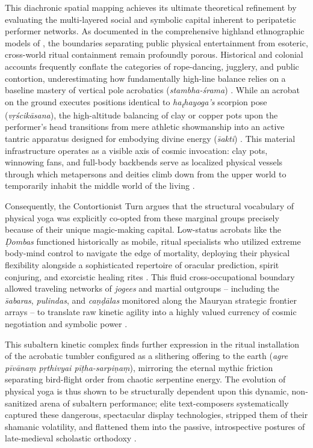\documentclass[11pt,twoside,letterpaper]{article}
\begin{document}
This diachronic spatial mapping achieves its ultimate theoretical refinement by evaluating the multi-layered social and symbolic capital inherent to peripatetic performer networks. As documented in the comprehensive highland ethnographic models of \citet{Berger2023}, the boundaries separating public physical entertainment from esoteric, cross-world ritual containment remain profoundly porous. Historical and colonial accounts frequently conflate the categories of rope-dancing, jugglery, and public contortion, underestimating how fundamentally high-line balance relies on a baseline mastery of vertical pole acrobatics (\textit{stambha-śrama}) \citep{Berger2023}. While an acrobat on the ground executes positions identical to \textit{ha\textsubscript{t}hayoga's} scorpion pose (\textit{vṛścikāsana}), the high-altitude balancing of clay or copper pots upon the performer’s head transitions from mere athletic showmanship into an active tantric apparatus designed for embodying divine energy (\textit{\={s}akti}) \citep{Berger2023}. This material infrastructure operates as a visible axis of cosmic invocation: clay pots, winnowing fans, and full-body backbends serve as localized physical vessels through which metapersons and deities climb down from the upper world to temporarily inhabit the middle world of the living \citep[397]{Berger2023}. 

Consequently, the Contortionist Turn argues that the structural vocabulary of physical yoga was explicitly co-opted from these marginal groups precisely because of their unique magic-making capital. Low-status acrobats like the \textit{\d{D}ombas} functioned historically as mobile, ritual specialists who utilized extreme body-mind control to navigate the edge of mortality, deploying their physical flexibility alongside a sophisticated repertoire of oracular prediction, spirit conjuring, and exorcistic healing rites \citep{Berger2023, Olivelle2011}. This fluid cross-occupational boundary allowed traveling networks of \textit{jogees} and martial outgroups -- including the \textit{\={s}abaras}, \textit{pulindas}, and \textit{ca\d{n}\d{d}\={a}las} monitored along the Mauryan strategic frontier arrays -- to translate raw kinetic agility into a highly valued currency of cosmic negotiation and symbolic power \citep{Kangle1969}. 

This subaltern kinetic complex finds further expression in the ritual installation of the acrobatic tumbler configured as a slithering offering to the earth (\textit{agre pīvānaṃ pṛthivyai pīṭha-sarpiṇaṃ}), mirroring the eternal mythic friction separating bird-flight order from chaotic serpentine energy. The evolution of physical yoga is thus shown to be structurally dependent upon this dynamic, non-sanitized arena of subaltern performance; elite text-composers systematically captured these dangerous, spectacular display technologies, stripped them of their shamanic volatility, and flattened them into the passive, introspective postures of late-medieval scholastic orthodoxy \citep{Birch2024, Mallinson2017, Wujastyk2025}.
\end{document}
